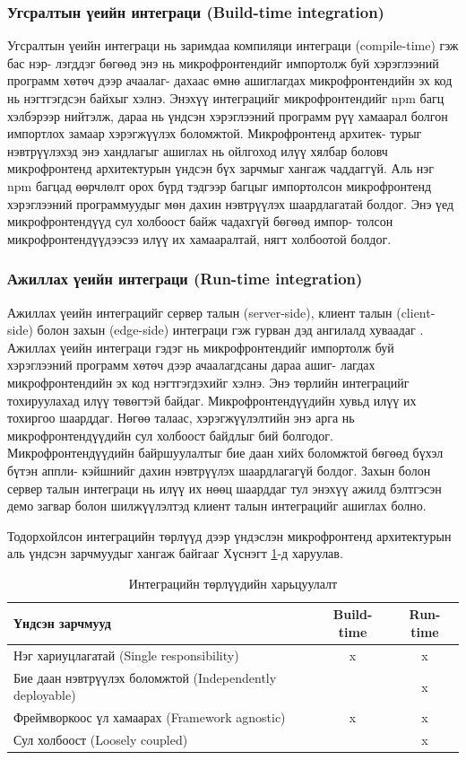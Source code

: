 \subsubsection{Угсралтын үеийн интеграци (Build-time integration)}
\hspace*{1cm}Угсралтын үеийн интеграци нь заримдаа компиляци интеграци (compile-time) гэж бас нэр- лэгддэг бөгөөд энэ нь микрофронтендийг импортолж буй хэрэглээний программ хөтөч дээр ачаалаг- дахаас өмнө ашиглагдах микрофронтендийн эх код нь нэгтгэгдсэн байхыг хэлнэ. Энэхүү интеграцийг микрофронтендийг npm багц хэлбэрээр нийтэлж, дараа нь үндсэн хэрэглээний программ рүү хамаарал болгон импортлох замаар хэрэгжүүлэх боломжтой. Микрофронтенд архитек- турыг нэвтрүүлэхэд энэ хандлагыг ашиглах нь ойлгоход илүү хялбар боловч микрофронтенд архитектурын үндсэн бүх зарчмыг хангаж чаддаггүй. Аль нэг npm багцад өөрчлөлт орох бүрд тэдгээр багцыг импортолсон микрофронтенд хэрэглээний программуудыг мөн дахин нэвтрүүлэх шаардлагатай болдог. Энэ үед микрофронтендүүд сул холбоост байж чадахгүй бөгөөд импор- толсон микрофронтендүүдээсээ илүү их хамааралтай, нягт холбоотой болдог.
\subsubsection{Ажиллах үеийн интеграци (Run-time integration)}
\hspace*{1cm}Ажиллах үеийн интеграцийг сервер талын (server-side), клиент талын (client-side) болон захын (edge-side) интеграци гэж гурван дэд ангилалд хуваадаг \cite{microfrontends_info}. Ажиллах үеийн интеграци гэдэг нь микрофронтендийг импортолж буй хэрэглээний программ хөтөч дээр ачаалагдсаны дараа ашиг- лагдах микрофронтендийн эх код нэгтгэгдэхийг хэлнэ. Энэ төрлийн интеграцийг тохируулахад илүү төвөгтэй байдаг. Микрофронтендүүдийн хувьд илүү их тохиргоо шаарддаг. Нөгөө талаас, хэрэгжүүлэлтийн энэ арга нь микрофронтендүүдийн сул холбоост байдлыг бий болгодог. Микрофронтендүүдийн байршуулалтыг бие даан хийх боломжтой бөгөөд бүхэл бүтэн аппли- кэйшнийг дахин нэвтрүүлэх шаардлагагүй болдог. Захын болон сервер талын интеграци нь илүү их нөөц шаарддаг тул энэхүү ажилд бэлтгэсэн демо загвар болон шилжүүлэлтэд клиент талын интеграцийг ашиглах болно.

Тодорхойлсон интеграцийн төрлүүд дээр үндэслэн микрофронтенд архитектурын аль үндсэн зарчмуудыг хангаж байгааг Хүснэгт \ref{tab:integration_types}-д харуулав. 
\begin{table}[H]
\centering
\caption{Интеграцийн төрлүүдийн харьцуулалт}
\label{tab:integration_types}
\renewcommand{\arraystretch}{0.7}
\begin{tabular}{lcc}
\toprule
\textbf{Үндсэн зарчмууд} & \textbf{Build-time} & \textbf{Run-time} \\
\midrule
Нэг хариуцлагатай (Single responsibility) & x & x \\
Бие даан нэвтрүүлэх боломжтой (Independently deployable) & & x \\
Фреймворкоос үл хамаарах (Framework agnostic) & x & x \\
Сул холбоост (Loosely coupled) & & x \\
\bottomrule
\end{tabular}
\end{table}

